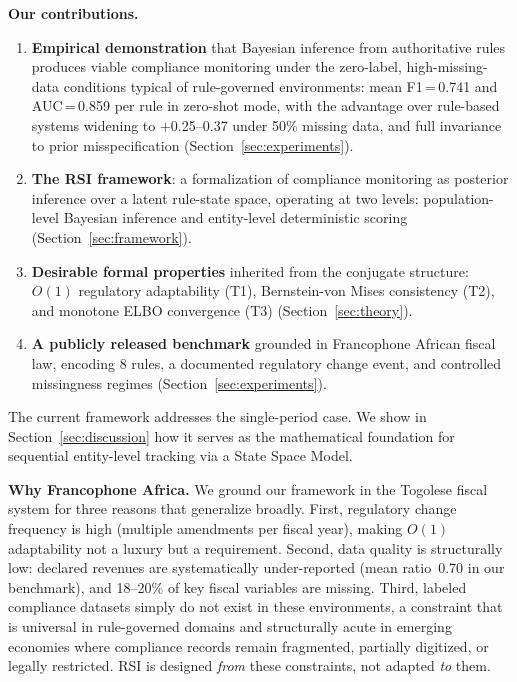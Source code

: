 \documentclass[letterpaper]{article}
\begin{document}
\medskip
\noindent\textbf{Our contributions.}
\begin{enumerate}[leftmargin=2em, label=(\arabic*)]
  \item \textbf{Empirical demonstration} that Bayesian inference from
        authoritative rules produces viable compliance monitoring
        under the zero-label, high-missing-data conditions typical of
        rule-governed environments: mean F1\,=\,0.741 and
        AUC\,=\,0.859 per rule in zero-shot mode, with the advantage
        over rule-based systems widening to $+$0.25--0.37 under 50\%
        missing data, and full invariance to prior misspecification
        (Section~\ref{sec:experiments}).
  \item \textbf{The RSI framework}: a formalization of compliance
        monitoring as posterior inference over a latent rule-state
        space, operating at two levels: population-level Bayesian
        inference and entity-level deterministic scoring
        (Section~\ref{sec:framework}).
  \item \textbf{Desirable formal properties} inherited from the
        conjugate structure: $O(1)$ regulatory adaptability (T1),
        Bernstein-von Mises consistency (T2), and monotone ELBO
        convergence (T3) (Section~\ref{sec:theory}).
  \item \textbf{A publicly released benchmark} grounded in
        Francophone African fiscal law, encoding 8 rules, a
        documented regulatory change event, and controlled
        missingness regimes (Section~\ref{sec:experiments}).
\end{enumerate}

\noindent The current framework addresses the single-period case. We
show in Section~\ref{sec:discussion} how it serves as the mathematical
foundation for sequential entity-level tracking via a State Space Model.

\medskip
\noindent\textbf{Why Francophone Africa.}
We ground our framework in the Togolese fiscal system for three reasons
that generalize broadly. First, regulatory change frequency is high
(multiple amendments per fiscal year), making $O(1)$ adaptability not
a luxury but a requirement. Second, data quality is structurally low:
declared revenues are systematically under-reported (mean ratio~0.70
in our benchmark), and 18--20\% of key fiscal variables are missing.
Third, labeled compliance datasets simply do not exist in these
environments, a constraint that is universal in rule-governed domains
and structurally acute in emerging economies where compliance records
remain fragmented, partially digitized, or legally restricted.
RSI is designed \emph{from} these constraints, not adapted \emph{to}
them.
\end{document}
